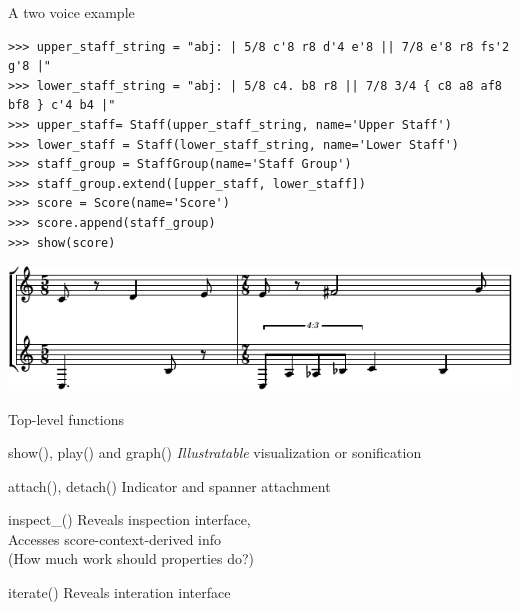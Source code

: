 \begin{frame}[fragile]{A two voice example}

\begin{abjadbookoutput}
\begin{singlespacing}
\vspace{-0.5\baselineskip}
\begin{verbatim}
>>> upper_staff_string = "abj: | 5/8 c'8 r8 d'4 e'8 || 7/8 e'8 r8 fs'2 g'8 |"
>>> lower_staff_string = "abj: | 5/8 c4. b8 r8 || 7/8 3/4 { c8 a8 af8 bf8 } c'4 b4 |"
>>> upper_staff= Staff(upper_staff_string, name='Upper Staff')
>>> lower_staff = Staff(lower_staff_string, name='Lower Staff')
>>> staff_group = StaffGroup(name='Staff Group')
>>> staff_group.extend([upper_staff, lower_staff])
>>> score = Score(name='Score')
>>> score.append(staff_group)
>>> show(score)
\end{verbatim}
\noindent\includegraphics[max width=\textwidth,]{assets/lilypond-e3b1c40a4191d3949ecaa427d7f31b59.pdf}
\end{singlespacing}
\end{abjadbookoutput}

\end{frame}

\begin{frame}[fragile]{Top-level functions}
    \begin{block}{show(), play() and graph()}
        \emph{Illustratable} visualization or sonification
    \end{block}
    \begin{block}{attach(), detach()}
        Indicator and spanner attachment
    \end{block}
    \begin{block}{inspect\_()}
        Reveals inspection interface,\\
        Accesses score-context-derived info\\
        (How much work should properties do?)
    \end{block}
    \begin{block}{iterate()}
        Reveals interation interface
    \end{block}
\end{frame}

